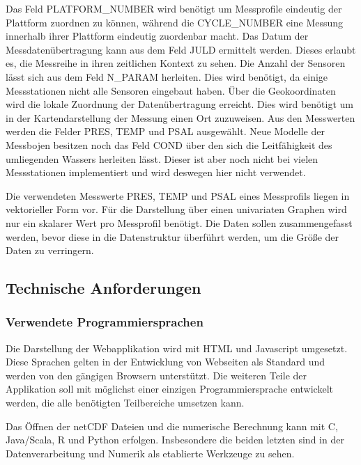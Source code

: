 Das Feld PLATFORM\_NUMBER wird benötigt um Messprofile eindeutig der Plattform zuordnen zu können, während die CYCLE\_NUMBER eine Messung innerhalb ihrer Plattform eindeutig zuordenbar macht. Das Datum der Messdatenübertragung kann aus dem Feld JULD ermittelt werden. Dieses erlaubt es, die Messreihe in ihren zeitlichen Kontext zu sehen. Die Anzahl der Sensoren lässt sich aus dem Feld N\_PARAM herleiten. Dies wird benötigt, da einige Messstationen nicht alle Sensoren eingebaut haben. Über die Geokoordinaten wird die lokale Zuordnung der Datenübertragung erreicht. Dies wird benötigt um in der Kartendarstellung der Messung einen Ort zuzuweisen.
Aus den Messwerten werden die Felder PRES, TEMP und PSAL ausgewählt. Neue Modelle der Messbojen besitzen noch das Feld COND über den sich die Leitfähigkeit des umliegenden Wassers herleiten lässt. Dieser ist aber noch nicht bei vielen Messstationen implementiert und wird deswegen hier nicht verwendet.

Die verwendeten Messwerte PRES, TEMP und PSAL eines Messprofils liegen in vektorieller Form vor. Für die Darstellung über einen univariaten Graphen wird nur ein skalarer Wert pro Messprofil benötigt. Die Daten sollen zusammengefasst werden, bevor diese in die Datenstruktur überführt werden, um die Größe der Daten zu verringern. 
 

\subsection{Technische Anforderungen  }

\subsubsection{Verwendete Programmiersprachen}

Die Darstellung der Webapplikation wird mit HTML und Javascript umgesetzt. Diese Sprachen gelten in der Entwicklung von Webseiten als Standard und werden von den gängigen Browsern unterstützt.
Die weiteren Teile der Applikation soll mit möglichst einer einzigen  Programmiersprache entwickelt werden, die alle benötigten Teilbereiche umsetzen kann.

Das Öffnen der netCDF Dateien und die numerische Berechnung kann mit C, Java/Scala, R und Python erfolgen. Insbesondere die beiden letzten sind in der Datenverarbeitung und Numerik als etablierte Werkzeuge zu sehen.

